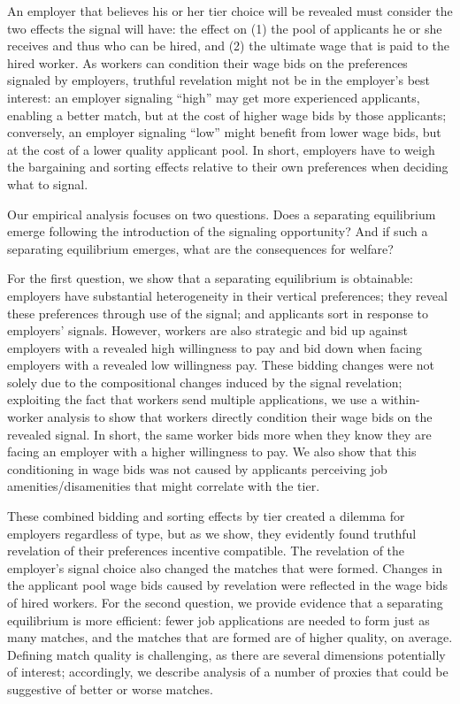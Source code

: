 An employer that believes his or her tier choice will be revealed must consider the two effects the signal will have:
the effect on (1) the pool of applicants he or she receives and thus who can be hired, and (2) the ultimate wage that is paid to the hired worker.
As workers can condition their wage bids on the preferences signaled by employers, truthful revelation might not be in the employer's best interest:
an employer signaling  ``high'' may get more experienced applicants, enabling a better match, but at the cost of higher wage bids by those applicants;
conversely, an employer signaling ``low'' might benefit from lower wage bids, but at the cost of a lower quality applicant pool.
In short, employers have to weigh the bargaining and sorting effects relative to their own preferences when deciding what to signal. 

Our empirical analysis focuses on two questions.
Does a separating equilibrium emerge following the introduction of the signaling opportunity?
And if such a separating equilibrium emerges, what are the consequences for welfare?

For the first question, we show that a separating equilibrium is obtainable: employers have substantial heterogeneity in their vertical preferences;
they reveal these preferences through use of the signal; and applicants sort in response to employers' signals.
However, workers are also strategic and bid up against employers with a revealed high willingness to pay and bid down when facing employers with a revealed low willingness pay.
These bidding changes were not solely due to the compositional changes induced by the signal revelation;
exploiting the fact that workers send multiple applications, we use a within-worker analysis to show that workers directly condition their wage bids on the revealed signal.
In short, the same worker bids more when they know they are facing an employer with a higher willingness to pay. 
We also show that this conditioning in wage bids was not caused by applicants perceiving job amenities/disamenities that might correlate with the tier.

These combined bidding and sorting effects by tier created a dilemma for employers regardless of type, but as we show, they evidently found truthful revelation of their preferences incentive compatible.
The revelation of the employer's signal choice also changed the matches that were formed.
Changes in the applicant pool wage bids caused by revelation were reflected in the wage bids of hired workers.
For the second question, we provide evidence that a separating equilibrium is more efficient:
fewer job applications are needed to form just as many matches, and the matches that are formed are of higher quality, on average. 
Defining match quality is challenging, as there are several dimensions potentially of interest;%
accordingly, we describe analysis of a number of proxies that could be suggestive of better or worse matches. 

